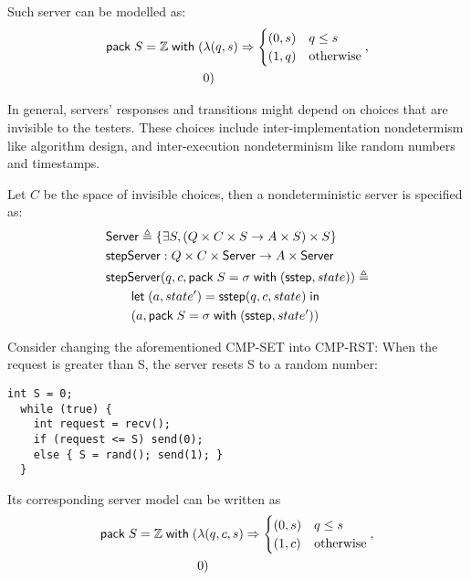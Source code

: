 Such server can be modelled as:
\begin{align*}
  \mathsf{pack}\;S=\mathbb Z\;\mathsf{with}\;(&\lambda(q,s)\Rightarrow\begin{cases}
        (0,s)&q\le s\\
        (1,q)&\mathrm{otherwise}
    \end{cases},\\
    &0)
\end{align*}

In general, servers' responses and transitions might depend on choices that are
invisible to the testers.  These choices include inter-implementation
nondetermism like algorithm design, and inter-execution nondeterminism like
random numbers and timestamps.
\begin{definition}
  \label{def:server}
  Let $C$ be the space of invisible choices, then a nondeterministic server is
  specified as:
\begin{align*}
  &\mathsf{Server}\triangleq\{\exists S,(Q \times C \times S \to A \times S) \times S\} \\
  &\mathsf{stepServer}:Q\times C \times \mathsf{Server} \to A\times \mathsf{Server} \\
  &\mathsf{stepServer}(q,c,\mathsf{pack}\;S=\sigma\;\mathsf{with}\;(\mathsf{sstep}, state))\triangleq\\
  &\qquad\mathsf{let}\;(a,state')=\mathsf{sstep}(q,c,state)\;\mathsf{in}\; \\
  &\qquad(a, \mathsf{pack}\;S=\sigma\;\mathsf{with}\;(\mathsf{sstep}, state'))
\end{align*}
\end{definition}

Consider changing the aforementioned CMP-SET into CMP-RST: When the
request is greater than \inlinec S, the server resets \inlinec S to a
random number:
\begin{lstlisting}[style=customc]
  int S = 0;
  while (true) {
    int request = recv();
    if (request <= S) send(0);
    else { S = rand(); send(1); }
  }
\end{lstlisting}
Its corresponding server model can be written as
\begin{align*}
  \mathsf{pack}\;S=\mathbb Z\;\mathsf{with}\;(&\lambda(q,c,s)\Rightarrow
      \begin{cases}
        (0,s)& q\le s\\
        (1,c)&\mathrm{otherwise}
      \end{cases}
   ,\\
    &0)
\end{align*}


